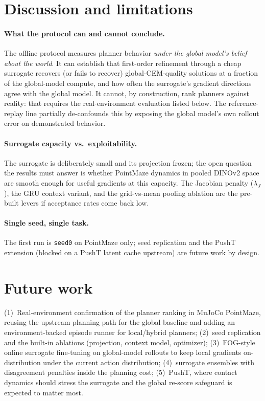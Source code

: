 \documentclass[11pt,a4paper]{article}
\begin{document}
\section{Discussion and limitations}
\label{sec:discussion}

\paragraph{What the protocol can and cannot conclude.} The offline protocol
measures planner behavior \emph{under the global model's belief about the
world}. It can establish that first-order refinement through a cheap
surrogate recovers (or fails to recover) global-CEM-quality solutions at a
fraction of the global-model compute, and how often the surrogate's gradient
directions agree with the global model. It cannot, by construction, rank
planners against reality: that requires the real-environment evaluation
listed below. The reference-replay line partially de-confounds this by
exposing the global model's own rollout error on demonstrated behavior.

\paragraph{Surrogate capacity vs.\ exploitability.} The surrogate is
deliberately small and its projection frozen; the open question the results
must answer is whether PointMaze dynamics in pooled DINOv2 space are smooth
enough for useful gradients at this capacity. The Jacobian penalty
($\lambda_J$), the GRU context variant, and the grid-vs-mean pooling ablation
are the pre-built levers if acceptance rates come back low.

\paragraph{Single seed, single task.} The first run is \texttt{seed0} on
PointMaze only; seed replication and the PushT extension (blocked on a PushT
latent cache upstream) are future work by design.

\section{Future work}
\label{sec:future}

(1)~Real-environment confirmation of the planner ranking in MuJoCo PointMaze,
reusing the upstream planning path for the global baseline and adding an
environment-backed episode runner for local/hybrid planners; (2)~seed
replication and the built-in ablations (projection, context model, optimizer);
(3)~FOG-style online surrogate fine-tuning on global-model rollouts to keep
local gradients on-distribution under the current action distribution;
(4)~surrogate ensembles with disagreement penalties inside the planning cost;
(5)~PushT, where contact dynamics should stress the surrogate and the global
re-score safeguard is expected to matter most.
\end{document}
